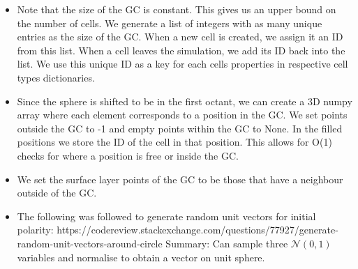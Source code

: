 \documentclass[english]{article}
\begin{document}
\begin{itemize}


\item Note that the size of the GC is constant. This gives us an upper bound on the number of cells. We generate a list of integers with as many unique entries as the size of the GC. When a new cell is created, we assign it an ID from this list. When a cell leaves the simulation, we add its ID back into the list. We use this unique ID as a key for each cells properties in respective cell types dictionaries. 

\item Since the sphere is shifted to be in the first octant, we can create a 3D numpy array where each element corresponds to a position in the GC. We set points outside the GC to -1 and empty points within the GC to None. In the filled positions we store the ID of the cell in that position. This allows for O(1) checks for where a position is free or inside the GC. 

\item We set the surface layer points of the GC to be those that have a neighbour outside of the GC. 

\item The following was followed to generate random unit vectors for initial polarity: https://codereview.stackexchange.com/questions/77927/generate-random-unit-vectors-around-circle
Summary: Can sample three $\mathcal{N}(0,1)$ variables and normalise to obtain a vector on unit sphere. 


\end{itemize}
\end{document}
